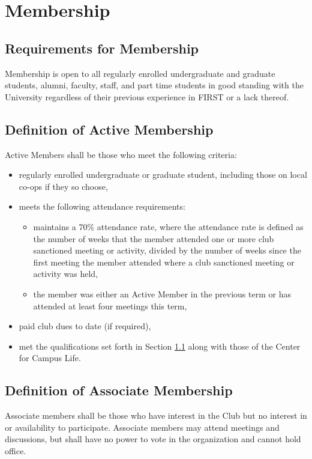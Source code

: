\documentclass[english,11pt]{article}
\begin{document}
\section{Membership} \label{art:membership}

\subsection{Requirements for Membership} \label{sect:membership:requirements}
Membership is open to all regularly enrolled undergraduate and graduate students, alumni, faculty, staff, and part time students in good standing with the University regardless of their previous experience in FIRST or a lack thereof.

\subsection{Definition of Active Membership} \label{sect:membership:active}
Active Members shall be those who meet the following criteria:
\begin{itemize}
    \item regularly enrolled undergraduate or graduate student, including those on local co-ops if they so choose,
    \item meets the following attendance requirements:
    \begin{itemize}
        \item maintains a 70\% attendance rate, where the attendance rate is defined as the number of weeks that the member attended one or more club sanctioned meeting or activity, divided by the number of weeks since the first meeting the member attended where a club sanctioned meeting or activity was held,
        \item the member was either an Active Member in the previous term or has attended at least four meetings this term,
    \end{itemize}
    \item paid club dues to date (if required),
    \item met the qualifications set forth in Section \ref{sect:membership:requirements} along with those of the Center for Campus Life.
\end{itemize}

\subsection{Definition of Associate Membership} \label{sect:membership:associate}
Associate members shall be those who have interest in the Club but no interest in or availability to participate.
Associate members may attend meetings and discussions, but shall have no power to vote in the organization and cannot hold office.
\end{document}
